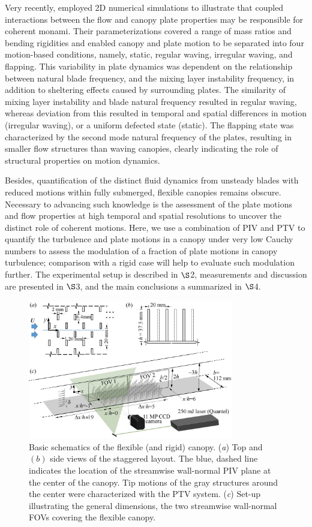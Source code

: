 \documentclass[lineno,authoryear]{FLO_v1}%
\theoremstyle{definition}
\begin{document}
Very recently, \citet{o2019dynamic} employed 2D numerical simulations to illustrate 
that coupled interactions between the flow and canopy plate properties may be responsible 
for coherent monami. Their parameterizations covered a range of mass ratios and bending 
rigidities and enabled canopy and plate motion to be separated into four motion-based conditions, 
namely, static, regular waving, irregular waving, and flapping. This variability in plate dynamics 
was dependent on the relationship between natural blade frequency, and the mixing layer instability 
frequency, in addition to sheltering effects caused by surrounding plates. The similarity of mixing 
layer instability and blade natural frequency resulted in regular waving, whereas deviation from 
this resulted in temporal and spatial differences in motion (irregular waving), or a uniform defected 
state (static). The flapping state was characterized by the second mode natural frequency of the 
plates, resulting in smaller flow structures than waving canopies, clearly indicating the role of 
structural properties on motion dynamics.


Besides, quantification of the distinct fluid dynamics from unsteady blades with reduced 
motions within fully submerged, flexible canopies remains obscure. Necessary to advancing 
such knowledge is the assessment of the plate motions and flow properties at high temporal and 
spatial resolutions to uncover the distinct role of coherent motions. Here, we use a combination 
of PIV and PTV to quantify the turbulence and plate motions in a canopy under very low Cauchy 
numbers to assess the modulation of a fraction of plate motions in canopy turbulence; comparison 
with a rigid case will help to evaluate such modulation further.  
The experimental setup is described in $\S$2, measurements and discussion are 
presented in $\S$3, and the main conclusions a summarized in $\S$4.


\begin{figure}
	\centerline{\includegraphics[width=0.8\textwidth]{fig1}}
	\caption{Basic schematics of the flexible (and rigid) canopy. (\textit{a}) Top and $(b)$ side views of the staggered layout. The blue, dashed line indicates the location of the streamwise wall-normal PIV plane at the center of the canopy. Tip motions of the gray structures around the center were characterized with the PTV system.  (\textit{c}) Set-up illustrating the general dimensions, the two streamwise wall-normal FOVs covering the flexible canopy.}
	\label{canopy_model}
\end{figure}
\end{document}
